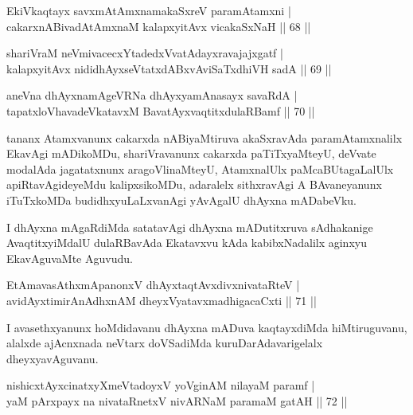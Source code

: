 \begin{shl}
EkiVkaqtayx savxmAtAmxnamakaSxreV paramAtamxni |\\
cakarxnABivadAtAmxnaM kalapxyitAvx vicakaSxNaH \hfill || 68 ||
\end{shl}
\begin{shl}
shariVraM neVmivacecxYtadedxVvatAdayxravajajxgatf |\\
kalapxyitAvx nididhAyxseVtatxdABxvAviSaTxdhiVH sadA \hfill || 69 ||
\end{shl}
\begin{shl}
aneVna dhAyxnamAgeVRNa dhAyxyamAnasayx savaRdA |\\
tapatxloVhavadeVkatavxM BavatAyxvaqtitxdulaRBamf \hfill || 70 ||
\end{shl}

\begin{artha}
tananx Atamxvanunx cakarxda nABiyaMtiruva akaSxravAda paramAtamxnalilx EkavAgi mADikoMDu, shariVravanunx cakarxda paTiTxyaMteyU, deVvate modalAda jagatatxnunx aragoVlinaMteyU, AtamxnalUlx paMcaBUtagaLalUlx apiRtavAgideyeMdu kalipxsikoMDu, adaralelx sithxravAgi A BAvaneyanunx iTuTxkoMDa budidhxyuLaLxvanAgi yAvAgalU dhAyxna mADabeVku.
\end{artha}



\begin{artha}
I dhAyxna mAgaRdiMda satatavAgi dhAyxna mADutitxruva sAdhakanige AvaqtitxyiMdalU dulaRBavAda Ekatavxvu kAda kabibxNadalilx aginxyu EkavAguvaMte Aguvudu.
\end{artha}

\begin{shl}
EtAmavasAthxmApanonxV dhAyxtaqtAvxdivxnivataRteV |\\
avidAyxtimirAnAdhxnAM dheyxVyatavxmadhigacaCxti \hfill || 71 ||
\end{shl}

\begin{artha}
I avasethxyanunx hoMdidavanu dhAyxna mADuva kaqtayxdiMda hiMtiruguvanu, alalxde ajAcnxnada neVtarx doVSadiMda kuruDarAdavarigelalx dheyxyavAguvanu.
\end{artha}


\begin{shl}
nishicxtAyxcinatxyXmeVtadoyxV yoVginAM nilayaM paramf |\\
yaM pArxpayx na nivataRnetxV nivARNaM paramaM gatAH \hfill || 72 ||
\end{shl}

